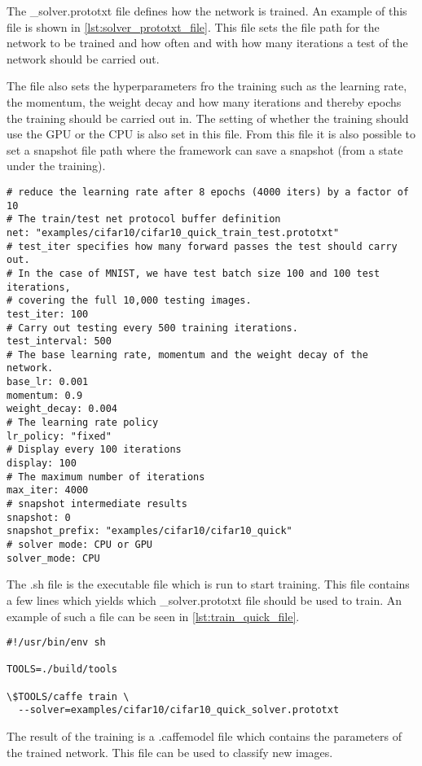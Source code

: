 The \_solver.prototxt file defines how the network is trained. An example of this file is shown in \autoref{lst:solver_prototxt_file}. This file sets the file path for the network to be trained and how often and with how many iterations a test of the network should be carried out.

The file also sets the hyperparameters fro the training such as the learning rate, the momentum, the weight decay and how many iterations and thereby epochs the training should be carried out in. The setting of whether the training should use the GPU or the CPU is also set in this file. From this file it is also possible to set a snapshot file path where the framework can save a snapshot (from a state under the training).

\begin{lstlisting}[caption = The code from the cifar10\_quick\_solver.prototxt from  the Cifar-10 tutorial provided by the framework. This file defines the hyperparameters for the training of the network., label={lst:solver_prototxt_file}]
# reduce the learning rate after 8 epochs (4000 iters) by a factor of 10
# The train/test net protocol buffer definition
net: "examples/cifar10/cifar10_quick_train_test.prototxt"
# test_iter specifies how many forward passes the test should carry out.
# In the case of MNIST, we have test batch size 100 and 100 test iterations,
# covering the full 10,000 testing images.
test_iter: 100
# Carry out testing every 500 training iterations.
test_interval: 500
# The base learning rate, momentum and the weight decay of the network.
base_lr: 0.001
momentum: 0.9
weight_decay: 0.004
# The learning rate policy
lr_policy: "fixed"
# Display every 100 iterations
display: 100
# The maximum number of iterations
max_iter: 4000
# snapshot intermediate results
snapshot: 0
snapshot_prefix: "examples/cifar10/cifar10_quick"
# solver mode: CPU or GPU
solver_mode: CPU
\end{lstlisting}

The .sh file is the executable file which is run to start training. This file contains a few lines which yields which \_solver.prototxt file should be used to train. An example of such a file can be seen in \autoref{lst:train_quick_file}.

\begin{lstlisting}[caption = The code from the train\_quick.sh file from  the Cifar-10 tutorial provided by the framework. This file is executable and yields which \_solver.prototxt file to us to start training., label={lst:train_quick_file}]
#!/usr/bin/env sh

TOOLS=./build/tools

\$TOOLS/caffe train \
  --solver=examples/cifar10/cifar10_quick_solver.prototxt
\end{lstlisting}

The result of the training is a .caffemodel file which contains the parameters of the trained network. This file can be used to classify new images.

